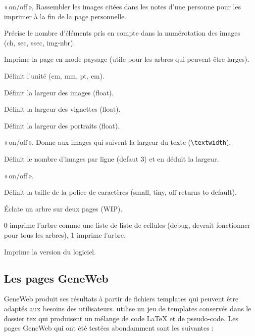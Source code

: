 \begin{description}[style=nextline]
\item[CollectImages] «\,on/off\,», Rassembler les images citées dans les notes
d'une personne pour les imprimer à la fin de la page personnelle.
\item[ImageLabel] Précise le nombre d'éléments pris en compte dans
la numérotation des images (ch, sec, ssec, img-nbr).
\item[Sideways] Imprime la page en mode paysage (utile pour les arbres
qui peuvent être larges).\label{sideways}
\item[Unit] Définit l'unité (cm, mm, pt, em).
\item[ImgWidth] Définit la largeur des images (float).
\item[VignWidth] Définit la largeur des vignettes (float).
\item[PortraitWidth] Définit la largeur des portraits (float).
\item[WideImages] «\,on/off\,». Donne aux images qui suivent la largeur du texte
(\verb|\textwidth|).
\item[NbImgPerLine] Définit le nombre d'images par ligne (defaut 3) et en
déduit la largeur.
\item[Arbres/Trees] «\,on/off\,».
\item[FontSize] Définit la taille de la police de caractères\label{fontsize}
(small, tiny, off returns to default).
\item[TwoPages] Éclate un arbre sur deux pages (WIP).
\item[TreeMode] 0 imprime l'arbre comme une liste de liste de cellules
(debug, devrait fonctionner pour tous les arbres), 1 imprime l'arbre.

\item[Version] Imprime la version du logiciel.
\end{description}

\subsection{Les pages GeneWeb}

GeneWeb produit ses résultats à partir de fichiers templates qui peuvent être
adaptés aux besoins des utilisateurs.
\gwtol{} utilise un jeu de templates conservés dans le dossier tex qui
produisent un mélange de code \LaTeX{} et de pseudo-code.
Les pages GeneWeb qui ont été testées abondamment sont les suivantes :


